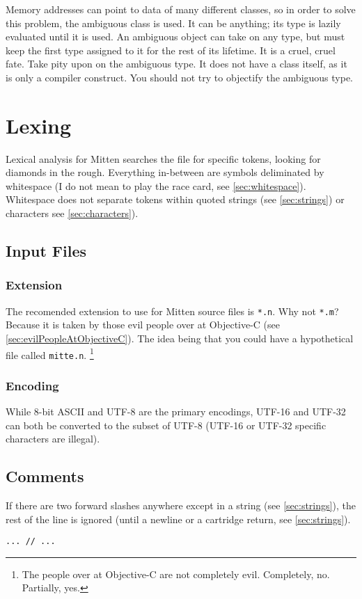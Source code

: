 \documentclass[10pt,a4paper]{article}
\begin{document}
Memory addresses can point to data of many different classes, so in order to solve this problem, the ambiguous class is used. It can be anything; its type is lazily evaluated until it is used. An ambiguous object can take on any type, but must keep the first type assigned to it for the rest of its lifetime. It is a cruel, cruel fate. Take pity upon on the ambiguous type. It does not have a class itself, as it is only a compiler construct. You should not try to objectify the ambiguous type.

\section{Lexing}
Lexical analysis for Mitten searches the file for specific tokens, looking for diamonds in the rough. Everything in-between are symbols deliminated by whitespace (I do not mean to play the race card, see \ref{sec:whitespace}). Whitespace does not separate tokens within quoted strings (see \ref{sec:strings}) or characters see \ref{sec:characters}).

\subsection{Input Files}
\subsubsection{Extension}
The recomended extension to use for Mitten source files is \verb|*.n|. Why not \verb|*.m|? Because it is taken by those evil people over at Objective-C (see \ref{sec:evilPeopleAtObjectiveC}). The idea being that you could have a hypothetical file called \verb|mitte.n|. \footnote{The people over at Objective-C are not completely evil. Completely, no. Partially, yes.}

\subsubsection{Encoding}
While 8-bit ASCII and UTF-8 are the primary encodings, UTF-16 and UTF-32 can both be converted to the subset of UTF-8 (UTF-16 or UTF-32 specific characters are illegal).

\subsection{Comments}
\label{sec:comments}
If there are two forward slashes anywhere except in a string (see \ref{sec:strings}), the rest of the line is ignored (until a newline or a cartridge return, see \ref{sec:strings}).
\begin{verbatim}
... // ...
\end{verbatim}
\end{document}
